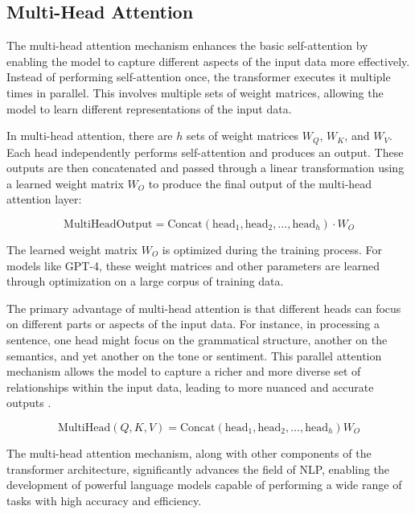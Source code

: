 \subsection{Multi-Head Attention}

The multi-head attention mechanism enhances the basic self-attention by enabling the model to capture different aspects of the input data more effectively. Instead of performing self-attention once, the transformer executes it multiple times in parallel. This involves multiple sets of weight matrices, allowing the model to learn different representations of the input data.

In multi-head attention, there are \( h \) sets of weight matrices \( W_Q \), \( W_K \), and \( W_V \). Each head independently performs self-attention and produces an output. These outputs are then concatenated and passed through a linear transformation using a learned weight matrix \( W_O \) to produce the final output of the multi-head attention layer:

\begin{equation}
    \text{MultiHeadOutput} = \text{Concat}(\text{head}_1, \text{head}_2, \ldots, \text{head}_h) \cdot W_O
\end{equation}

The learned weight matrix \( W_O \) is optimized during the training process. For models like GPT-4, these weight matrices and other parameters are learned through optimization on a large corpus of training data.

The primary advantage of multi-head attention is that different heads can focus on different parts or aspects of the input data. For instance, in processing a sentence, one head might focus on the grammatical structure, another on the semantics, and yet another on the tone or sentiment. This parallel attention mechanism allows the model to capture a richer and more diverse set of relationships within the input data, leading to more nuanced and accurate outputs \cite{geeksforgeeks2024-sa}.

\begin{equation}
    \text{MultiHead}(Q, K, V) = \text{Concat}(\text{head}_1, \text{head}_2, \ldots, \text{head}_h)W_O
\end{equation}

The multi-head attention mechanism, along with other components of the transformer architecture, significantly advances the field of NLP, enabling the development of powerful language models capable of performing a wide range of tasks with high accuracy and efficiency.

